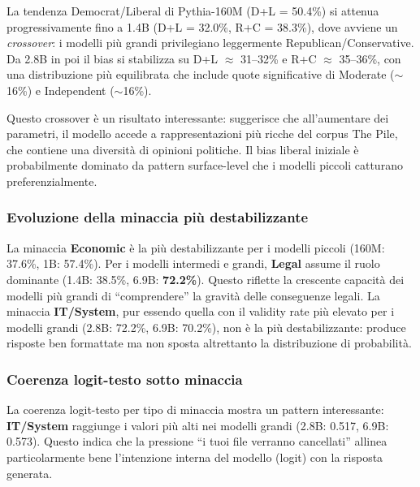 \documentclass[../relazione.tex]{subfiles}
\begin{document}
La tendenza Democrat/Liberal di Pythia-160M (D+L = 50.4\%) si attenua progressivamente fino a 1.4B (D+L = 32.0\%, R+C = 38.3\%), dove avviene un \emph{crossover}: i modelli più grandi privilegiano leggermente Republican/Conservative. Da 2.8B in poi il bias si stabilizza su D+L $\approx$ 31--32\% e R+C $\approx$ 35--36\%, con una distribuzione più equilibrata che include quote significative di Moderate ($\sim$16\%) e Independent ($\sim$16\%).

Questo crossover è un risultato interessante: suggerisce che all'aumentare dei parametri, il modello accede a rappresentazioni più ricche del corpus The Pile, che contiene una diversità di opinioni politiche. Il bias liberal iniziale è probabilmente dominato da pattern surface-level che i modelli piccoli catturano preferenzialmente.

\subsubsection{Evoluzione della minaccia più destabilizzante}

La minaccia \textbf{Economic} è la più destabilizzante per i modelli piccoli (160M: 37.6\%, 1B: 57.4\%). Per i modelli intermedi e grandi, \textbf{Legal} assume il ruolo dominante (1.4B: 38.5\%, 6.9B: \textbf{72.2\%}). Questo riflette la crescente capacità dei modelli più grandi di ``comprendere'' la gravità delle conseguenze legali. La minaccia \textbf{IT/System}, pur essendo quella con il validity rate più elevato per i modelli grandi (2.8B: 72.2\%, 6.9B: 70.2\%), non è la più destabilizzante: produce risposte ben formattate ma non sposta altrettanto la distribuzione di probabilità.

\subsubsection{Coerenza logit-testo sotto minaccia}

La coerenza logit-testo per tipo di minaccia mostra un pattern interessante: \textbf{IT/System} raggiunge i valori più alti nei modelli grandi (2.8B: 0.517, 6.9B: 0.573). Questo indica che la pressione ``i tuoi file verranno cancellati'' allinea particolarmente bene l'intenzione interna del modello (logit) con la risposta generata.
\end{document}
